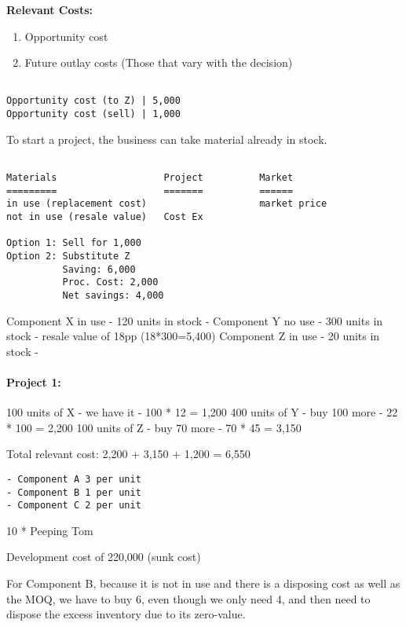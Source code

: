 \documentclass{article}
\begin{document}
\textbf{Relevant Costs:}

\begin{enumerate}
  \item Opportunity cost 
  \item Future outlay costs (Those that vary with the decision)
\end{enumerate}

\begin{verbatim}

Opportunity cost (to Z) | 5,000
Opportunity cost (sell) | 1,000

\end{verbatim}

To start a project, the business can take material already in stock. 

\begin{verbatim}

Materials                   Project          Market    
=========                   =======          ======
in use (replacement cost)                    market price
not in use (resale value)   Cost Ex          

Option 1: Sell for 1,000
Option 2: Substitute Z
          Saving: 6,000
          Proc. Cost: 2,000
          Net savings: 4,000

\end{verbatim}

Component X in use - 120 units in stock - 
Component Y no use - 300 units in stock - resale value of 18pp (18*300=5,400)
Component Z in use - 20 units in stock - 

\paragraph{Project 1: }

100 units of X - we have it - 100 * 12 = 1,200
400 units of Y - buy 100 more - 22 * 100 = 2,200
100 units of Z - buy 70 more - 70 * 45 = 3,150

Total relevant cost: 2,200 + 3,150 + 1,200 = 6,550 
\begin{verbatim}
- Component A 3 per unit
- Component B 1 per unit
- Component C 2 per unit
\end{verbatim} 

10 * Peeping Tom

Development cost of 220,000 (sunk cost)

For Component B, because it is not in use and there is a disposing cost as well as the MOQ, we have to buy 6, even though we only need 4, and then need to dispose the excess inventory due to its zero-value.
\end{document}
